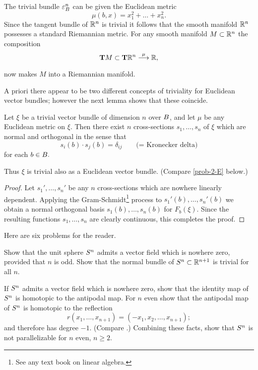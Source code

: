 \documentclass[../main]{subfiles}
\begin{document}
\begin{example} 
The trivial bundle $\varepsilon^n_{B}$ can be given the Euclidean metric
\[
\mu(b, x)=x_{1}^{2}+\dots+x_{n}^{2}.
\]
Since the tangent bundle of $\mathbb R^n$ is trivial it follows that the smooth manifold $\mathbb R^n$ possesses a standard Riemannian metric. For any smooth manifold $M \subset \mathbb R^n$ the composition
\[
\tangentTS{M} \subset \tangentTS{\bR^n}\varrightarrow{\mu} \bR, 
\]
now makes $M$ into a Riemannian manifold.
\end{example}


A priori there appear to be two different concepts of triviality for Euclidean vector bundles; however the next lemma shows that these coincide.


\begin{lemma}\label{lem:02.04}
Let $\xi$ be a trivial vector bundle of dimension $n$ over ${B}$, and let $\mu$ be any Euclidean metric on $\xi$. Then there exist $n$ cross-sections $s_1, \dots, s_n$ of $\xi$ which are normal and orthogonal in the sense that 
\[
s_i(b)\cdot s_j(b)= \delta_{ij} \qquad \text{(= Kronecker delta)} 
\] %
for each $b\in {B}.$
\end{lemma}


Thus $\xi$ is trivial also as a Euclidean vector bundle. (Compare \ref{prob-2-E} below.)


\begin{proof}
Let $s_1 ', \dots, s_n '$ be any $n$ cross-sections which are nowhere linearly dependent. Applying the Gram-Schmidt\footnote{See any text book on linear algebra.} process to $s_1 '(b), \dots, s_n '(b)$ we obtain a normal orthogonal basis $s_1 (b), \dots, s_n (b)$ for $F_b(\xi)$. Since the resulting functions $s_1,\dots,s_n$ are clearly continuous, this completes the proof.
\end{proof}


Here are six problems for the reader.


\begin{problem}\label{prob-2-A}
Show that the unit sphere $S^{n}$ admits a vector field which is nowhere zero, provided that $n$ is odd. Show that the normal bundle of $S^{n}\subset\mathbb R^{n+1}$ is trivial for all $n$.
\end{problem}


\begin{problem}\label{prob-2-B}
If $S^{n}$ admits a vector field which is nowhere zero, show that the identity map of $S^{n}$ is homotopic to the antipodal map. For $n$ even show that the antipodal map of $S^{n}$ is homotopic to the reflection 
\[
r(x_1, \dots, x_{n+1}) = (-x_1, x_2 ,\dots, x_{n+1});
\]
and therefore has degree $-1$. (Compare \cite[p.304]{eilenbergsteenrod1952}.) Combining these facts, show that $S^{n}$ is not parallelizable for $n$ even, $n \geq 2$.
\end{problem}
\end{document}
